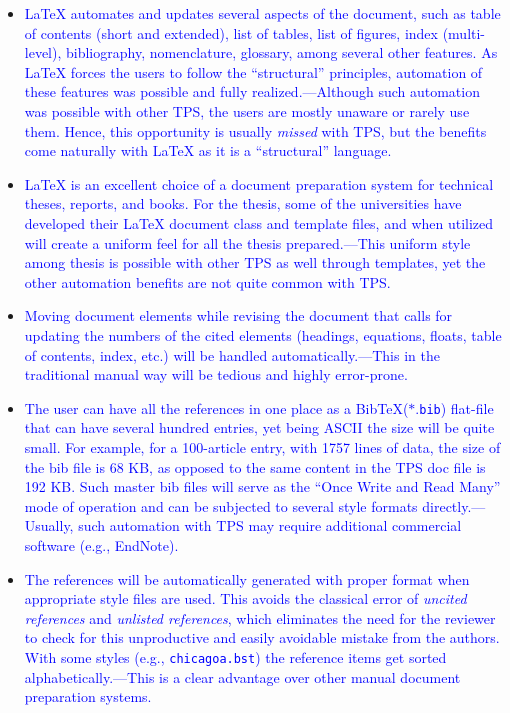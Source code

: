 \documentclass[phd]{ndsu-thesis-2022}
\newcommand\italk[1]{\textcolor{blue}{#1}}  %
\newcommand\lx{\LaTeX\xspace}
\newcommand\bx{Bib\!\TeX\xspace}
\newcommand\vb[1]{\textcolor{blue}{\texttt{#1}}}%
\begin{document}
\begin{itemize}[leftmargin=*, itemsep=0pt, parsep=3pt]
\item \italk{\lx automates and updates several aspects of the document, such as table of contents (short and extended), list of tables, list of figures, index (multi-level), bibliography, nomenclature, glossary, among several other features. As \lx forces the users to follow the ``structural'' principles, automation of these features was possible and fully realized.---Although such automation was possible with other TPS, the users are mostly unaware or rarely use them. Hence, this opportunity is usually \emph{missed} with TPS, but the benefits come naturally with \lx as it is a ``structural'' language.}

\item \italk{\lx is an excellent choice of a document preparation system for technical theses, reports, and books.  For the thesis, some of the universities have developed their \lx document class and template files, and when utilized will create a uniform feel for all the thesis prepared.---This uniform style among thesis is possible with other TPS as well through templates, yet the other automation benefits are not quite common with TPS.}  

\item \italk{Moving document elements while revising the document that calls for updating the numbers of the cited elements (headings, equations, floats, table of contents, index, etc.) will be handled automatically.---This in the traditional manual way will be tedious and highly error-prone.}   

\item \italk{The user can have all the references in one place as a \bx  ($\ast$.\vb{bib}) flat-file that can have several hundred entries, yet being ASCII the size will be quite small. For example, for a 100-article entry, with 1757 lines of data, the size of the bib file is 68 KB, as opposed to the same content in the TPS doc file is 192 KB. Such master bib files will serve as the ``Once Write and Read Many'' mode of operation and can be subjected to several style formats directly.---Usually, such automation with TPS may require additional commercial software (e.g., EndNote).} 

\item \italk{The references will be automatically generated with proper format when appropriate style files are used. This avoids the classical error of \emph{uncited references} and \emph{unlisted references}, which eliminates the need for the reviewer to check for this unproductive and easily avoidable mistake from the authors.  With some styles (e.g., \vb{chicagoa.bst}) the reference items get sorted alphabetically.---This is a clear advantage over other manual document preparation systems.}   


\end{itemize}
\end{document}
